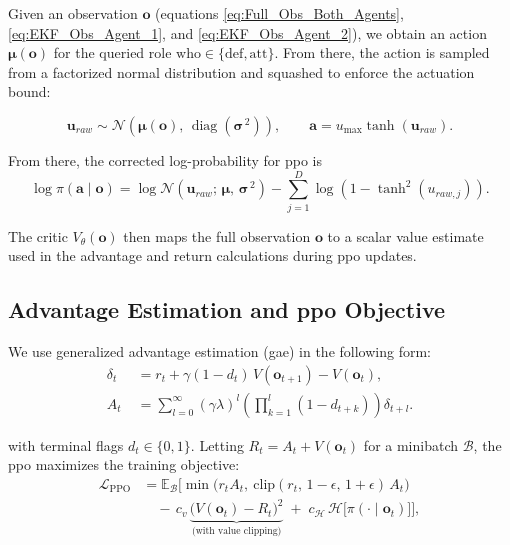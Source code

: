 Given an observation \(\mathbf{o}\) (equations \ref{eq:Full_Obs_Both_Agents}, \ref{eq:EKF_Obs_Agent_1}, and \ref{eq:EKF_Obs_Agent_2}), we obtain an action $\boldsymbol{\mu}(\mathbf{o})$ for the queried role \(\mathrm{who}\in\{\mathrm{def},\mathrm{att}\}\). From there, the action is sampled from a factorized normal distribution and squashed to enforce the actuation bound:

\[
\mathbf{u}_{raw} \sim \mathcal{N}\!\left(\boldsymbol{\mu}(\mathbf{o}),\, \operatorname{diag}\!\left(\boldsymbol{\sigma}^{\,2}\right)\right),
\qquad
\mathbf{a} = u_{\max}\tanh\!\left(\mathbf{u}_{raw}\right).
\]

From there, the corrected log-probability for \acs{ppo} is
\[
\log \pi(\mathbf{a} \mid \mathbf{o})
=
\log \mathcal{N}\!\left(\mathbf{u}_{raw};\, \boldsymbol{\mu},\, \boldsymbol{\sigma}^{\,2}\right)
-
\sum_{j=1}^{D}\log\!\left(1-\tanh^2(u_{raw,j})\right).
\]


The critic \(V_\theta(\mathbf{o})\) then maps the full observation \(\mathbf{o}\) to a scalar value estimate used in the advantage and return calculations during \acs{ppo} updates.



\subsection{Advantage Estimation and \acs{ppo} Objective}
\label{subsec:advantage-estimation-ppo}
We use generalized advantage estimation (\acs{gae}) in the following form:
\[
\begin{aligned}
\delta_t \;&= r_t + \gamma(1-d_t)\,V(\mathbf{o}_{t+1}) - V(\mathbf{o}_{t}),\\[4pt]
A_t \;&= \sum_{l=0}^{\infty} (\gamma\lambda)^l
\left(\prod_{k=1}^{l} (1-d_{t+k})\right)\delta_{t+l}.
\end{aligned}
\]

with terminal flags \(d_t\in\{0,1\}\). Letting  \(R_t=A_t+V(\mathbf{o}_t)\) for a minibatch \(\mathcal{B}\), the \acs{ppo} maximizes the training objective:
\begin{align*}
\mathcal{L}_{\text{PPO}}
&= \mathbb{E}_{\mathcal{B}}\Big[
\min\!\big(r_t A_t,\ \mathrm{clip}(r_t,\,1{-}\epsilon,\,1{+}\epsilon)\,A_t\big)
\\
&\quad -\, c_v\,\underbrace{\big(V(\mathbf{o}_t) - R_t\big)^2}_{\text{(with value clipping)}}
\;+\; c_{\mathcal{H}}\,\mathcal{H}\!\big[\pi(\cdot\!\mid \mathbf{o}_t)\big]
\Big],
\end{align*}

